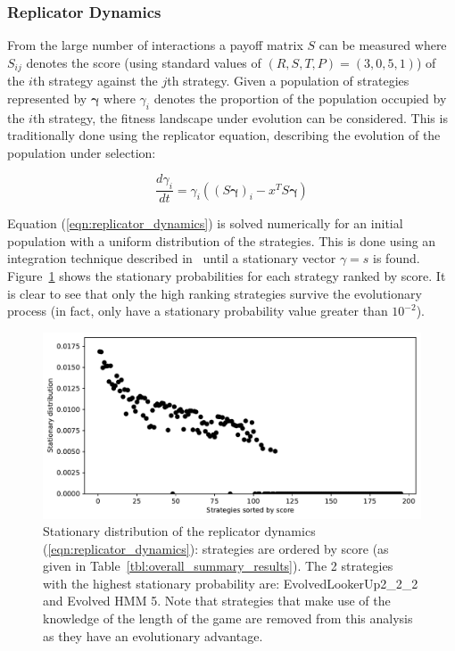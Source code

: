 \documentclass[a4paper]{article}
\begin{document}
\subsubsection{Replicator Dynamics}

From the large number of interactions a payoff matrix \(S\) can be measured
where \(S_{ij}\) denotes the score (using standard values of \((R, S, T, P) =
(3, 0, 5, 1)\)) of the \(i\)th strategy against the \(j\)th strategy. Given a
population of strategies represented by \(\boldsymbol{\gamma}\) where \(\gamma_i\)
denotes the proportion of the population occupied by the \(i\)th strategy, the
fitness landscape under evolution can be considered. This is traditionally done
using the replicator equation, describing the evolution of the population
under selection:

\begin{equation}\label{eqn:replicator_dynamics}
    \frac{d \gamma_i}{dt} = \gamma_i ((S\boldsymbol{\gamma})_i - x^T S \boldsymbol{\gamma})
\end{equation}

Equation (\ref{eqn:replicator_dynamics}) is solved numerically for an initial
population with a uniform distribution of the strategies. This is done using an
integration technique described in~\cite{Petzold1983} until a stationary vector
\(\gamma=s\) is found.
Figure~\ref{fig:replicator_dynamics} shows the stationary probabilities for each
strategy ranked by score.
It is clear to see that
only the high ranking strategies survive the evolutionary process (in fact,
only have a stationary
probability value greater than \(10 ^ {-2}\)).

\begin{figure}[!htbp]
    \centering
    \includegraphics[width=.8\textwidth]{./assets/img/replicator_dynamics/main.pdf}
    \caption{Stationary distribution of the replicator dynamics
    (\ref{eqn:replicator_dynamics}): strategies are ordered by score (as given
    in Table~\ref{tbl:overall_summary_results}). The 2
    strategies with the highest stationary probability are:
    EvolvedLookerUp2\_2\_2 and Evolved HMM 5.
    Note that
    strategies that make use of the knowledge of the length of the game are
    removed from this analysis as they have an evolutionary advantage.}
    \label{fig:replicator_dynamics}
\end{figure}
\end{document}
